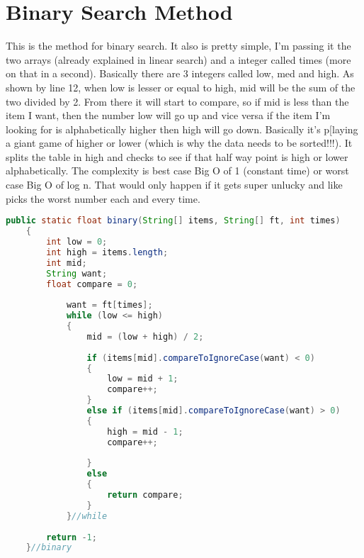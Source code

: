 \documentclass[letterpaper, 10pt]{article}
\begin{document}
\section{Binary Search Method}
This is the method for binary search. It also is pretty simple, I'm passing it the two arrays (already explained in linear search) and a integer called times (more on that in a second). Basically there are 3 integers called low, med and high. As shown by line 12, when low is lesser or equal to high, mid will be the sum of the two divided by 2. From there it will start to compare, so if mid is less than the item I want, then the number low will go up and vice versa if the item I'm looking for is alphabetically higher then high will go down. Basically it's p[laying a giant game of higher or lower (which is why the data needs to be sorted!!!). It splits the table in high and checks to see if that half way point is high or lower alphabetically. The complexity is best case Big O of 1 (constant time) or worst case Big O of log n. That would only happen if it gets super unlucky and like picks the worst number each and every time.
\begin{lstlisting}[language = java]
public static float binary(String[] items, String[] ft, int times)
	{
		int low = 0;
		int high = items.length;
		int mid;
		String want;
		float compare = 0;
		
			want = ft[times];
			while (low <= high)
			{
				mid = (low + high) / 2;
				
				if (items[mid].compareToIgnoreCase(want) < 0)
				{
					low = mid + 1;
					compare++;
				}
				else if (items[mid].compareToIgnoreCase(want) > 0)
				{
					high = mid - 1;
					compare++;
					
				}
				else 
				{
					return compare;
				}
			}//while
		
		return -1;
	}//binary
\end{lstlisting}
\end{document}
